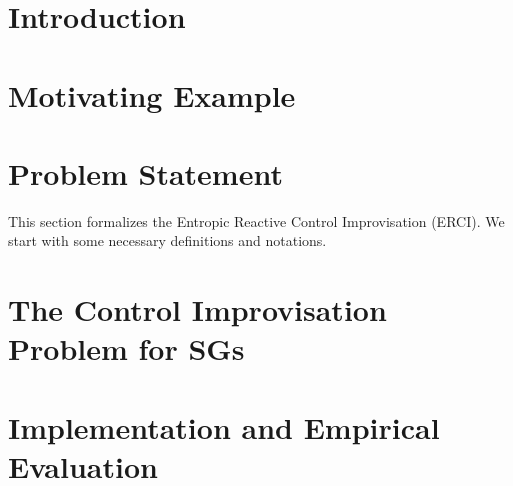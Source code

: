\documentclass[conference]{IEEEtran}
\theoremstyle{remark}
\newcommand{\sg}{\mathcal{G}}
\newcommand{\eventually}[1]{\lozenge^{\leq #1}}
\newcommand{\sched}{\sigma}
\begin{document}
\section{Introduction}

\section{Motivating Example}
\label{sec:motivating}


\section{Problem Statement}
\label{sec:problem}
This section formalizes the Entropic Reactive Control Improvisation (ERCI).  We start with some necessary definitions and notations.








 
\section{The Control Improvisation Problem for SGs}\label{sec:sgs}

%


\section{Implementation and Empirical Evaluation}
\label{sec:empirical}








\end{document}

